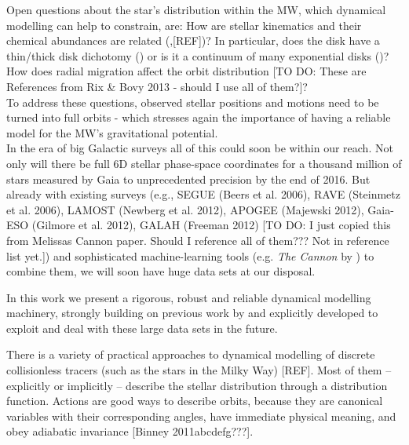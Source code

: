 Open questions about the star's distribution within the MW, which dynamical modelling can help to constrain, are: How are stellar kinematics and their chemical abundances are related (\cite{san15},[REF])? In particular, does the disk have a thin/thick disk dichotomy (\cite{gil83}) or is it a continuum of many exponential disks (\cite{bov12d})? How does radial migration affect the orbit distribution \citep{sel02,ros08a,ros08b,sch08,min11} [TO DO: These are References from Rix \& Bovy 2013 - should I use all of them?]?\\
To address these questions, observed stellar positions and motions need to be turned into full orbits - which stresses again the importance of having a reliable model for the MW's gravitational potential. \\

In the era of big Galactic surveys all of this could soon be within our reach. Not only will there be full 6D stellar phase-space coordinates for a thousand million of stars measured by Gaia to unprecedented precision by the end of 2016. But already with existing surveys (e.g., SEGUE (Beers et al. 2006), RAVE (Steinmetz et al. 2006), LAMOST (Newberg et al. 2012), APOGEE (Majewski 2012), Gaia-ESO (Gilmore et al. 2012), GALAH (Freeman 2012) [TO DO: I just copied this from Melissas Cannon paper. Should I reference all of them??? Not in reference list yet.]) and sophisticated machine-learning tools (e.g. \emph{The Cannon} by \cite{nes15}) to combine them, we will soon have huge data sets at our disposal.

In this work we present a rigorous, robust and reliable dynamical modelling machinery, strongly building on previous work by \citet{bin11,bin12,bov13,bov15} and explicitly developed to exploit and deal with these large data sets in the future.

There is a variety of practical approaches to dynamical modelling of discrete collisionless tracers (such as the stars in the Milky Way) [REF]. Most of them -- explicitly or implicitly -- describe the stellar distribution through a distribution function.  Actions are good ways to describe orbits, because they are canonical variables with their corresponding angles, have immediate physical meaning, and obey adiabatic invariance [Binney 2011abcdefg???]. \\


